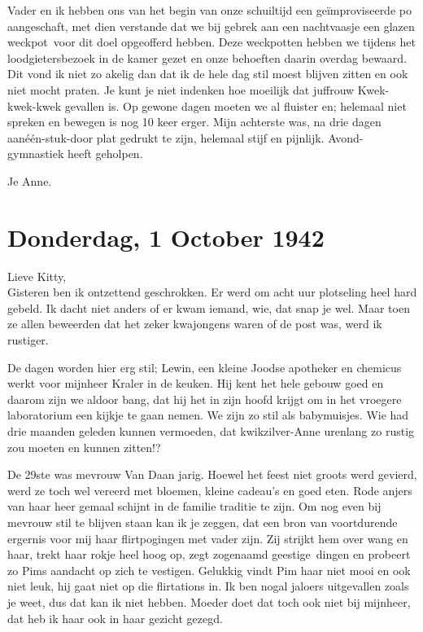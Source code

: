 \documentclass{book}
\begin{document}
Vader en ik hebben ons van het begin van onze schuiltijd een geïmproviseerde po
aangeschaft, met dien verstande dat we bij gebrek aan een nachtvaasje een glazen
weckpot~voor dit doel opgeofferd hebben. Deze weckpotten hebben we tijdens het
loodgietersbezoek in de kamer gezet en onze behoeften daarin overdag bewaard.
Dit vond ik niet zo akelig dan dat ik de hele dag stil moest blijven zitten en
ook niet mocht praten.  Je kunt je niet indenken hoe moeilijk dat juffrouw
Kwek-kwek-kwek gevallen is. Op gewone dagen moeten we al fluister en; helemaal
niet spreken en bewegen is nog 10 keer erger. Mijn achterste was, na drie dagen
aanéén-stuk-door plat gedrukt te zijn, helemaal stijf en pijnlijk.
Avond-gymnastiek heeft geholpen.

Je Anne.

\section*{Donderdag, 1 October 1942}

Lieve Kitty,\\
Gisteren ben ik ontzettend geschrokken. Er werd om acht uur
plotseling heel hard gebeld. Ik dacht niet anders of er kwam iemand, wie, dat
snap je wel.  Maar toen ze allen beweerden dat het zeker kwajongens waren of de
post was, werd ik rustiger.

De dagen worden hier erg stil; Lewin, een kleine Joodse apotheker en chemicus
werkt voor mijnheer Kraler in de keuken. Hij kent het hele gebouw goed en daarom
zijn we aldoor bang, dat hij het in zijn hoofd krijgt om in het vroegere
laboratorium een kijkje te gaan nemen. We zijn zo stil als babymuisjes. Wie had
drie maanden geleden kunnen vermoeden, dat kwikzilver-Anne urenlang zo rustig
zou moeten en kunnen zitten!?

De 29ste was mevrouw Van Daan jarig. Hoewel het feest niet groots werd gevierd,
werd ze toch wel vereerd met bloemen, kleine cadeau's en goed eten. Rode anjers
van haar heer gemaal schijnt in de familie traditie te zijn. Om nog even bij
mevrouw stil te blijven staan kan ik je zeggen, dat een bron van voortdurende
ergernis voor mij haar flirtpogingen met vader zijn. Zij strijkt hem over wang
en haar, trekt haar rokje heel hoog op, zegt zogenaamd geestige~dingen en
probeert zo Pims aandacht op zich te vestigen. Gelukkig vindt Pim haar niet mooi
en ook niet leuk, hij gaat niet op die flirtations in. Ik ben nogal jaloers
uitgevallen zoals je weet, dus dat kan ik niet hebben. Moeder doet dat toch ook
niet bij mijnheer, dat heb ik haar ook in haar gezicht gezegd.
\end{document}
